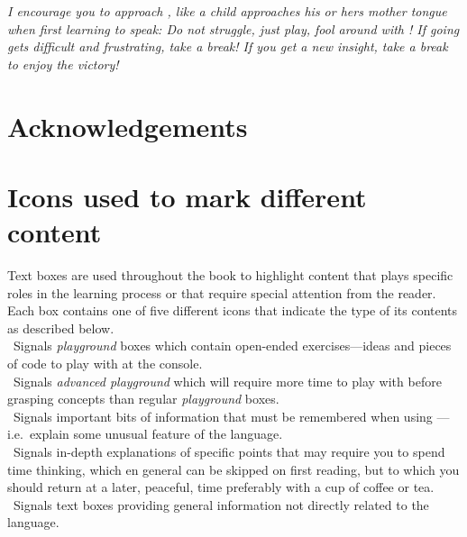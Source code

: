 \emph{I encourage you to approach \Rlang, like a child approaches his or hers mother tongue when first learning to speak: Do not struggle, just play, fool around with \Rlang! If going gets difficult and frustrating, take a break! If you get a new insight, take a break to enjoy the victory!
}%

\section*{Acknowledgements}


\newpage
\noindent
\section*{Icons used to mark different content}

Text boxes are used throughout the book to highlight content that plays specific roles in the learning process or that require special attention from the reader. Each box contains one of five different icons that indicate the type of its contents as described below.\\[1.5ex]

\noindent
\playicon\ Signals \emph{playground} boxes which contain open-ended exercises---ideas and pieces of \Rlang code to play with at the \Rlang console.\\[1.5ex]

\noindent
\advplayicon\ Signals \emph{advanced playground} which will require more time to play with before grasping concepts than regular \emph{playground} boxes.\\[1.5ex]

\noindent
\ilAttention\ Signals important bits of information that must be remembered when using \Rlang---i.e.\ explain some unusual feature of the language.\\[1.5ex]

\noindent
\ilAdvanced\ Signals in-depth explanations of specific points that may require you to spend time thinking, which en general can be skipped on first reading, but to which you should return at a later, peaceful, time preferably with a cup of coffee or tea.\\[1.5ex]

\noindent
\infoicon\ Signals text boxes providing general information not directly related to the \Rlang language.\\[1.5ex]

